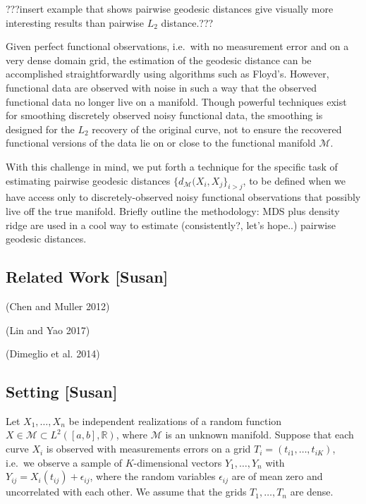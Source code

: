 \documentclass[]{article}
\begin{document}
???insert example that shows pairwise geodesic distances give visually
more interesting results than pairwise \(L_2\) distance.???

Given perfect functional observations, i.e.~with no measurement error
and on a very dense domain grid, the estimation of the geodesic distance
can be accomplished straightforwardly using algorithms such as Floyd's.
However, functional data are observed with noise in such a way that the
observed functional data no longer live on a manifold. Though powerful
techniques exist for smoothing discretely observed noisy functional
data, the smoothing is designed for the \(L_2\) recovery of the original
curve, not to ensure the recovered functional versions of the data lie
on or close to the functional manifold \(\mathcal{M}\).

With this challenge in mind, we put forth a technique for the specific
task of estimating pairwise geodesic distances
\(\{ d_\mathcal{M}(X_i,X_j\}_{i>j}\), to be defined when we have access
only to discretely-observed noisy functional observations that possibly
live off the true manifold. Briefly outline the methodology: MDS plus
density ridge are used in a cool way to estimate (consistently?, let's
hope..) pairwise geodesic distances.

\hypertarget{related-work-susan}{%
\subsection{Related Work {[}Susan{]}}\label{related-work-susan}}

(Chen and Muller 2012)

(Lin and Yao 2017)

(Dimeglio et al. 2014)

\hypertarget{setting-susan}{%
\subsection{Setting {[}Susan{]}}\label{setting-susan}}

Let \(X_1,\ldots,X_n\) be independent realizations of a random function
\(X\in\mathcal{M}\subset L^2([a,b],\mathbb{R})\), where \(\mathcal{M}\)
is an unknown manifold. Suppose that each curve \(X_i\) is observed with
measurements errors on a grid \(T_i=(t_{i1},\ldots,t_{iK})\), i.e.~we
observe a sample of \(K\)-dimensional vectors \(Y_1,\ldots,Y_n\) with
\(Y_{ij} = X_i(t_{ij}) + \epsilon_{ij}\), where the random variables
\(\epsilon_{ij}\) are of mean zero and uncorrelated with each other. We
assume that the grids \(T_1,\ldots,T_n\) are dense.
\end{document}

